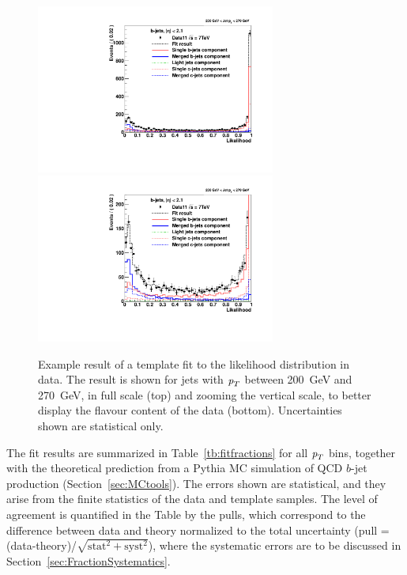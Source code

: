 \begin{figure}[tp]
\centering
\includegraphics[width=0.7\textwidth]{FIGS/Fits/LikelihoodFit_3param_ETAFull_Bin5.pdf}
\includegraphics[width=0.7\textwidth]{FIGS/Fits/LikelihoodFit_3param_ETAFull_ZOOM_Bin5.pdf}
\caption{Example result of a template fit to the likelihood distribution in data. The result is shown for jets with ${\emph{p}_{T}}$ between  200~GeV and 270~GeV, in full scale (top) and zooming the vertical scale, to better display the flavour content of the data (bottom). Uncertainties shown are statistical only.}
\label{fig:fittemplates2}
\end{figure}

The fit results are summarized in Table~\ref{tb:fitfractions} for all ${\emph{p}_{T}}$ bins, together with the theoretical prediction from a {\sc Pythia} MC simulation of QCD $b$-jet production (Section~\ref{sec:MCtools}). The errors shown are statistical, and they arise from the finite statistics of the data and template samples. The level of agreement is quantified in the Table by the pulls, which correspond to the difference between data and theory normalized to the total uncertainty (pull = (data-theory)/$\sqrt{\text{stat}^2+\text{syst}^2}$), where the systematic errors are to be discussed in Section~\ref{sec:FractionSystematics}. 

